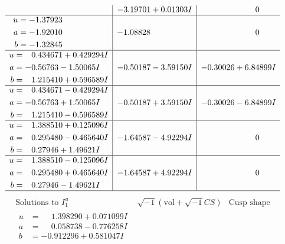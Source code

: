 \documentclass[1p]{elsarticle_modified}
\theoremstyle{definition}
\newcommand{\I}{\sqrt{-1}}
\begin{document}
$$\begin{array}{c|c|c}
 & -3.19701 + 0.01303 I & \phantom{-0.000000 } 0 \\ \hline\begin{aligned}
u &= -1.37923\phantom{ +0.000000I} \\
a &= -1.92010\phantom{ +0.000000I} \\
b &= -1.32845\phantom{ +0.000000I}\end{aligned}
 & -1.08828\phantom{ +0.000000I} & \phantom{-0.000000 } 0 \\ \hline\begin{aligned}
u &= \phantom{-}0.434671 + 0.429294 I \\
a &= -0.56763 - 1.50065 I \\
b &= \phantom{-}1.215410 + 0.596589 I\end{aligned}
 & -0.50187 - 3.59150 I & -0.30026 + 6.84899 I \\ \hline\begin{aligned}
u &= \phantom{-}0.434671 - 0.429294 I \\
a &= -0.56763 + 1.50065 I \\
b &= \phantom{-}1.215410 - 0.596589 I\end{aligned}
 & -0.50187 + 3.59150 I & -0.30026 - 6.84899 I \\ \hline\begin{aligned}
u &= \phantom{-}1.388510 + 0.125096 I \\
a &= \phantom{-}0.295480 - 0.465640 I \\
b &= \phantom{-}0.27946 + 1.49621 I\end{aligned}
 & -1.64587 - 4.92294 I & \phantom{-0.000000 } 0 \\ \hline\begin{aligned}
u &= \phantom{-}1.388510 - 0.125096 I \\
a &= \phantom{-}0.295480 + 0.465640 I \\
b &= \phantom{-}0.27946 - 1.49621 I\end{aligned}
 & -1.64587 + 4.92294 I & \phantom{-0.000000 } 0\\
 \hline 
 \end{array}$$\newpage$$\begin{array}{c|c|c}  
\text{Solutions to }I^u_{1}& \I (\text{vol} + \sqrt{-1}CS) & \text{Cusp shape}\\
 \hline 
\begin{aligned}
u &= \phantom{-}1.398290 + 0.071099 I \\
a &= \phantom{-}0.058738 - 0.776258 I \\
b &= -0.912296 + 0.581047 I\end{aligned}

\end{array}$$
\end{document}
